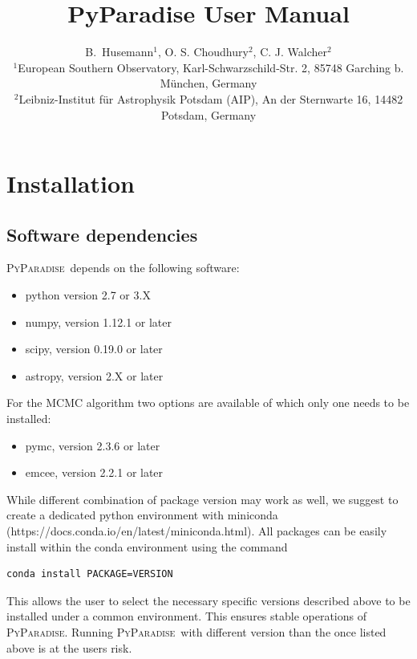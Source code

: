 \documentclass[usenatbib,usegraphicx,useAMS,onecolumn]{mn2e}
\newcommand{\PyPar}{\mbox{\textsc{PyParadise}}}
\begin{document}
\title{PyParadise User Manual}

\author[Husemann et al.]{B.~Husemann$^{1}$, O. S. Choudhury$^{2}$, C. J. Walcher$^{2}$\newauthor\\
$^1$European Southern Observatory, Karl-Schwarzschild-Str. 2, 85748 Garching b. M\"unchen, Germany\\
$^2$Leibniz-Institut f\"ur Astrophysik Potsdam (AIP), An der Sternwarte 16, 14482 Potsdam, Germany\\
}
\maketitle
\begin{abstract}

\end{abstract}

\section{Installation}
\label{sec:installation}
\subsection{Software dependencies}
\PyPar\ depends on the following software:
\begin{itemize}
    \item python version 2.7 or 3.X
    \item numpy, version 1.12.1 or later
    \item scipy, version 0.19.0 or later
    \item astropy, version 2.X or later
\end{itemize}
For the MCMC algorithm two options are available of which only one needs to be installed:
\begin{itemize}
    \item pymc, version 2.3.6 or later
    \item emcee, version 2.2.1 or later
\end{itemize}

While different combination of package version may work as well, we suggest to create a dedicated python environment with miniconda (https://docs.conda.io/en/latest/miniconda.html). All packages can be easily install within the conda environment using the command 
\begin{lstlisting}[language=sh]
    conda install PACKAGE=VERSION
\end{lstlisting}
This allows the user to select the necessary specific versions described above to be installed under a common environment. This ensures stable operations of \PyPar. Running \PyPar\ with different version than the once listed above is at the users risk.
\end{document}
